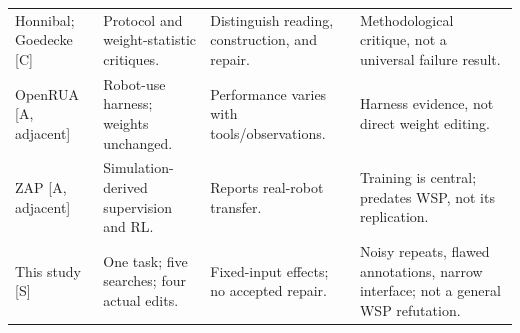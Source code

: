 \begin{table}[!t]
\begin{tabularx}{\textwidth}{@{}>{\RaggedRight\arraybackslash}p{}>{\RaggedRight\arraybackslash}p{}>{\RaggedRight\arraybackslash}p{}>{\RaggedRight\arraybackslash}X@{}}
Honnibal; Goedecke [C] \citep{honnibal2026,goedecke2026} & Protocol and weight-statistic critiques. & Distinguish reading, construction, and repair. & Methodological critique, not a universal failure result. \\
OpenRUA [A, adjacent] \citep{zuo2026openrua} & Robot-use harness; weights unchanged. & Performance varies with tools/observations. & Harness evidence, not direct weight editing. \\
ZAP [A, adjacent] \citep{ben2026zap} & Simulation-derived supervision and RL. & Reports real-robot transfer. & Training is central; predates WSP, not its replication. \\
This study [S] & One task; five searches; four actual edits. & Fixed-input effects; no accepted repair. & Noisy repeats, flawed annotations, narrow interface; not a general WSP refutation. \\
\bottomrule
\end{tabularx}
\end{table}
